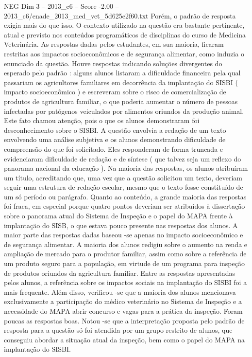 \begin{textsample}{NEG Dim 3 – 2013\_c6 – Score -2.00 – 2013\_c6/enade\_2013\_med\_vet\_5d625e2f60.txt}
Porém, o padrão de resposta exigia mais do que isso.
O contexto utilizado na questão era bastante pertinente, atual e previsto nos conteúdos programáticos de disciplinas do curso de Medicina Veterinária.
As respostas dadas pelos estudantes, em sua maioria, ficaram restritas aos impactos socioeconômicos e de segurança alimentar, como induzia o enunciado da questão.
Houve respostas indicando soluções divergentes do esperado pelo padrão : alguns alunos listaram a dificuldade financeira pela qual passariam os agricultores familiares em decorrência da implantação do SISBI ( impacto socioeconômico ) e escreveram sobre o risco de comercialização de produtos de agricultura familiar, o que poderia aumentar o número de pessoas infectadas por patógenos veiculados por alimentos oriundos da produção animal.
Este fato chamou atenção, pois o que os alunos demonstraram foi desconhecimento sobre o SISBI.
A questão envolvia a redação de um texto envolvendo uma análise subjetiva e os alunos demonstrando dificuldade de compreensão do que foi solicitado.
Eles responderam de forma truncada e evidenciaram dificuldade de redação e de síntese ( que talvez seja um reflexo do panorama nacional da educação ).
Na maioria das respostas, os alunos atribuíram um título, acreditando que, uma vez que a questão solicitou um texto, deveriam seguir uma estrutura de redação escolar, mesmo que o texto fosse constituído de um só período ou parágrafo.
Quanto ao conteúdo, a grande maioria das respostas foi fraca, em especial porque quatro pontos deveriam ser atribuídos à dissertação sobre o panorama atual do Sistema de Inspeção e o papel do MAPA frente à implantação do SISB, o que estava pouco presente nas respostas dos alunos.
A maior parte das respostas dadas baseou -se apenas no impacto socioeconômico e de segurança alimentar.
A maioria dos alunos redigiu sobre o aumento na renda e ampliação de mercado para o produtor familiar, assim como sobre a referência de um produto seguro para a população, em virtude de um programa para inspeção de produtos oriundos da agricultura familiar.
Entre as respostas apresentadas pelos alunos, a referência sobre os impactos sociais na implantação do SISBI foi a mais frequente.
Além disso, verificou -se que a maioria dos alunos mencionava exclusivamente a participação do médico veterinário no Sistema de Inspeção e a necessidade do MAPA abrir concurso e vagas para a prática da inspeção.
Foram poucas as respostas boas.
Notou -se que a interpretação proposta pelo padrão de resposta para a questão só foi atendida por um grupo restrito de alunos, que conseguiu abordar a situação atual da inspeção, bem como o papel do MAPA na implantação do SISBI.

\end{textsample}
